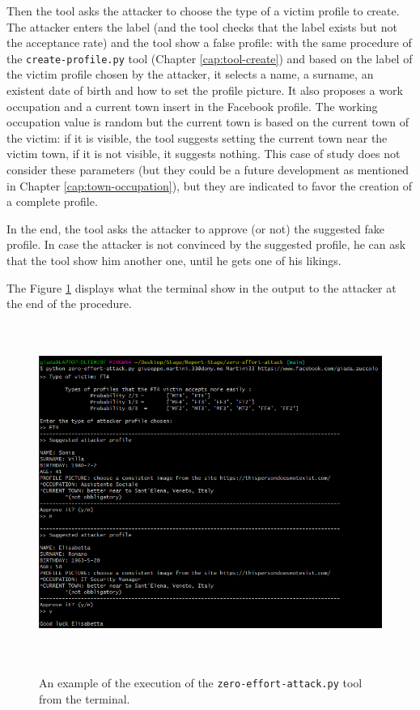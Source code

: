\par \noindent Then the tool asks the attacker to choose the type of a victim profile to create. The attacker enters the label (and the tool checks that the label exists but not the acceptance rate) and the tool show a false profile: with the same procedure of the \texttt{create-profile.py} tool (Chapter \ref{cap:tool-create}) and based on the label of the victim profile chosen by the attacker, it selects a name, a surname, an existent date of birth and how to set the profile picture. It also proposes a work occupation and a current town insert in the Facebook profile. The working occupation value is random but the current town is based on the current town of the victim: if it is visible, the tool suggests setting the current town near the victim town, if it is not visible, it suggests nothing. This case of study does not consider these parameters (but they could be a future development as mentioned in Chapter \ref{cap:town-occupation}), but they are indicated to favor the creation of a complete profile.
\par \noindent
In the end, the tool asks the attacker to approve (or not) the suggested fake profile. In case the attacker is not convinced by the suggested profile, he can ask that the tool show him another one, until he gets one of his likings.
\par \noindent
The Figure \ref{fig:zero-effort-tool} displays what the terminal show in the output to the attacker at the end of the procedure.

\begin{figure}[H]
	\centering
	\caption{An example of the execution of the \texttt{zero-effort-attack.py} tool from the terminal.}
	\includegraphics[height=11cm]{immagini/zero-effort-exe.png} 
	\label{fig:zero-effort-tool}
\end{figure}